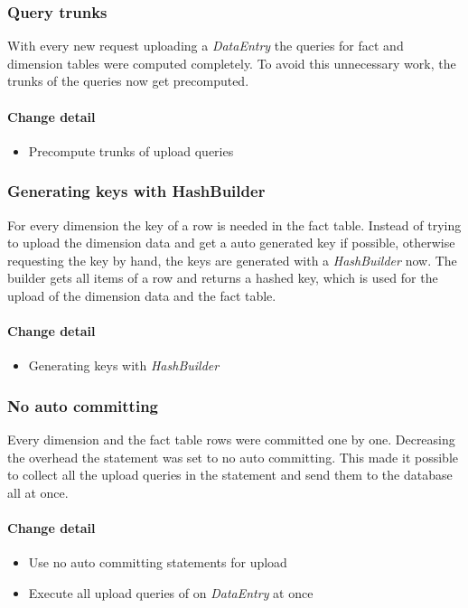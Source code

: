 \subsubsection{Query trunks}
With every new request uploading a \textit{DataEntry} the queries 
for fact and dimension tables were computed completely. To avoid
this unnecessary work, the trunks of the queries now get precomputed.

\paragraph{Change detail}
\begin{itemize}
  \item Precompute trunks of upload queries
\end{itemize}


\subsubsection{Generating keys with HashBuilder}
For every dimension the key of a row is needed in the fact table.
Instead of trying to upload the dimension data and get a auto generated key if possible,
otherwise requesting the key by hand, the keys are generated with a
\textit{HashBuilder} now. The builder gets all items of a row and
returns a hashed key, which is used for the upload of the dimension data
and the fact table.

\paragraph{Change detail}
\begin{itemize}
  \item Generating keys with \textit{HashBuilder}
\end{itemize}


\subsubsection{No auto committing}
Every dimension and the fact table rows were committed one by one. Decreasing
the overhead the statement was set to no auto committing. This made it possible
to collect all the upload queries in the statement and send them to the database
all at once.

\paragraph{Change detail} 
\begin{itemize}
  \item Use no auto committing statements for upload
  \item Execute all upload queries of on \textit{DataEntry} at once
\end{itemize}

